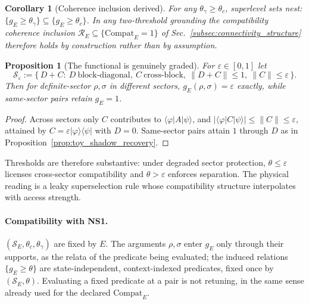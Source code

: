 \documentclass[aps,prx,onecolumn,11pt]{revtex4-2}
\theoremstyle{plain}
\newtheorem{proposition}{Proposition}
\newtheorem{corollary}{Corollary}
\theoremstyle{definition}
\theoremstyle{remark}
\begin{document}
\begin{corollary}[Coherence inclusion derived]
\label{cor:toy_shadow_coherence}
For any \(\theta_\gamma\ge\theta_c\), superlevel sets nest:
\(\{g_E\ge\theta_\gamma\}\subseteq\{g_E\ge\theta_c\}\). In any
two-threshold grounding the compatibility coherence inclusion
\(\mathcal R_E\subseteq
\{\mathrm{Compat}_E=1\}\)
of Sec.~\ref{subsec:connectivity_structure} therefore holds by
construction rather than by assumption.
\end{corollary}

\begin{proposition}[The functional is genuinely graded]
\label{prop:toy_shadow_graded}
For \(\varepsilon\in[0,1]\) let
\[
\mathcal S_\varepsilon
:=
\bigl\{\,D+C:\ D\ \text{block-diagonal},\ C\ \text{cross-block},\
\lVert D+C\rVert\le 1,\ \lVert C\rVert\le\varepsilon\,\bigr\}.
\]
Then for definite-sector \(\rho,\sigma\) in different sectors,
\(g_E(\rho,\sigma)=\varepsilon\) exactly, while same-sector pairs retain
\(g_E=1\).
\end{proposition}

\begin{proof}
Across sectors only \(C\) contributes to
\(\langle\varphi\rvert A\lvert\psi\rangle\), and
\(\lvert\langle\varphi\rvert C\lvert\psi\rangle\rvert
\le\lVert C\rVert\le\varepsilon\), attained by
\(C=\varepsilon\lvert\varphi\rangle\langle\psi\rvert\) with \(D=0\).
Same-sector pairs attain \(1\) through \(D\) as in
Proposition~\ref{prop:toy_shadow_recovery}.
\end{proof}

Thresholds are therefore substantive: under degraded sector protection,
\(\theta\le\varepsilon\) licenses cross-sector compatibility and
\(\theta>\varepsilon\) enforces separation. The physical reading is a
leaky superselection rule whose compatibility structure interpolates
with access strength.

\paragraph{Compatibility with NS1.}
\((\mathcal S_E,\theta_c,\theta_\gamma)\) are fixed by \(E\). The
arguments \(\rho,\sigma\) enter \(g_E\) only through their supports, as
the relata of the predicate being evaluated; the induced relations
\(\{g_E\ge\theta\}\) are state-independent, context-indexed predicates,
fixed once by \((\mathcal S_E,\theta)\). Evaluating a fixed predicate
at a pair is not retuning, in the same sense already used for the
declared \(\mathrm{Compat}_E\).
\end{document}
